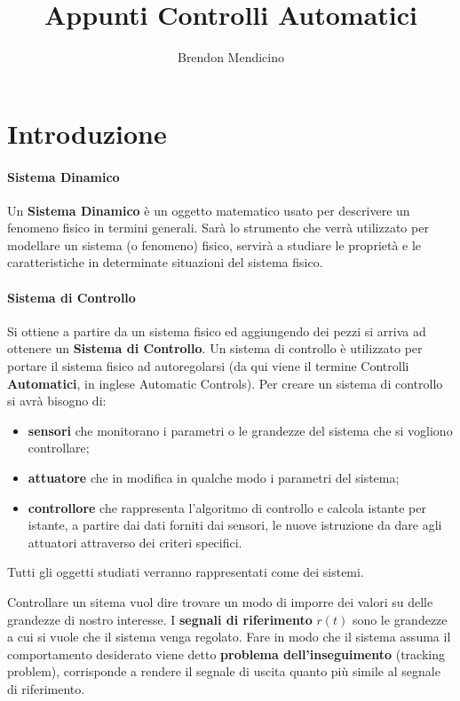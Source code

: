 \documentclass[12pt]{article}
\title{Appunti Controlli Automatici}
\author{Brendon Mendicino}
\begin{document}
\maketitle
\newpage
\tableofcontents
\newpage


\section{Introduzione}\label{sec:introduzione}
\paragraph{Sistema Dinamico}
Un \textbf{Sistema Dinamico} \`e un oggetto matematico usato per descrivere un fenomeno fisico in termini generali. Sar\`a lo strumento che verr\`a utilizzato per modellare un sistema (o fenomeno) fisico, servir\`a a studiare le propriet\`a e le caratteristiche in determinate situazioni del sistema fisico.

\paragraph{Sistema di Controllo}
Si ottiene a partire da un sistema fisico ed aggiungendo dei pezzi si arriva ad ottenere un \textbf{Sistema di Controllo}. Un sistema di controllo \`e utilizzato per portare il sistema fisico ad autoregolarsi (da qui viene il termine Controlli \textbf{Automatici}, in inglese Automatic Controls). Per creare un sistema di controllo si avr\`a bisogno di:
\begin{itemize}
    \item \textbf{sensori} che monitorano i parametri o le grandezze del sistema che si vogliono controllare;
    \item \textbf{attuatore} che in modifica in qualche modo i parametri del sistema;
    \item \textbf{controllore} che rappresenta l'algoritmo di controllo e calcola istante per istante, a partire dai dati forniti dai sensori, le nuove istruzione da dare agli attuatori attraverso dei criteri specifici.
\end{itemize}
Tutti gli oggetti studiati verranno rappresentati come dei sistemi.

Controllare un sitema vuol dire trovare un modo di imporre dei valori su delle grandezze di nostro interesse. I \textbf{segnali di riferimento} $r(t)$ sono le grandezze a cui si vuole che il sistema venga regolato. Fare in modo che il sistema assuma il comportamento desiderato viene detto \textbf{problema dell'inseguimento} (tracking problem), corrisponde a rendere il segnale di uscita quanto pi\`u simile al segnale di riferimento.
\end{document}
